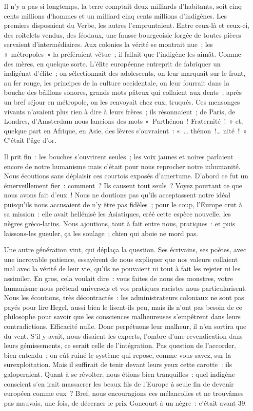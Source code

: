 \documentclass[french,twoside]{book} %
\newcommand\chaptercont{} %
\begin{document}
\chaptercont
\noindent Il n’y a pas si longtemps, la terre comptait deux milliards d’habitants, soit cinq cents millions d’hommes et un milliard cinq cents millions d’indigènes. Les premiers disposaient du Verbe, les autres l’empruntaient. Entre ceux-là et ceux-ci, des roitelets vendus, des féodaux, une fausse bourgeoisie forgée de toutes pièces servaient d’intermédiaires. Aux colonies la vérité se montrait nue ; les « métropoles » la préféraient vêtue ; il fallait que l’indigène les aimât. Comme des mères, en quelque sorte. L’élite européenne entreprit de fabriquer un indigénat d’élite ; on sélectionnait des adolescents, on leur marquait sur le front, au fer rouge, les principes de la culture occidentale, on leur fourrait dans la bouche des bâillons sonores, grands mots pâteux qui collaient aux dents ; après un bref séjour en métropole, on les renvoyait chez eux, truqués. Ces mensonges vivants n’avaient plus rien à dire à leurs frères ; ils résonnaient ; de Paris, de Londres, d’Amsterdam nous lancions des mots « Parthénon ! Fraternité ! » et, quelque part en Afrique, en Asie, des lèvres s’ouvraient : « … thénon !… nité ! » C’était l’âge d’or.\par
Il prit fin : les bouches s’ouvrirent seules ; les voix jaunes et noires parlaient encore de notre humanisme mais c’était pour nous reprocher notre inhumanité. Nous écoutions sans déplaisir ces courtois exposés d’amertume. D’abord ce fut un émerveillement fier : comment ? Ils causent tout seuls ? Voyez pourtant ce que nous avons fait d’eux ! Nous ne doutions pas qu’ils acceptassent notre idéal puisqu’ils nous accusaient de n’y être pas fidèles ; pour le coup, l’Europe crut à sa mission : elle avait hellénisé les Asiatiques, créé cette espèce nouvelle, les nègres gréco-latins. Nous ajoutions, tout à fait entre nous, pratiques : et puis laissons-les gueuler, ça les soulage ; chien qui aboie ne mord pas.\par
 Une autre génération vint, qui déplaça la question. Ses écrivains, ses poètes, avec une incroyable patience, essayèrent de nous expliquer que nos valeurs collaient mal avec la vérité de leur vie, qu’ils ne pouvaient ni tout à fait les rejeter ni les assimiler. En gros, cela voulait dire : vous faites de nous des monstres, votre humanisme nous prétend universels et vos pratiques racistes nous particularisent. Nous les écoutions, très décontractés : les administrateurs coloniaux ne sont pas payés pour lire Hegel, aussi bien le lisent-ils peu, mais ils n’ont pas besoin de ce philosophe pour savoir que les consciences malheureuses s’empêtrent dans leurs contradictions. Efficacité nulle. Donc perpétuons leur malheur, il n’en sortira que du vent. S’il y avait, nous disaient les experts, l’ombre d’une revendication dans leurs gémissements, ce serait celle de l’intégration. Pas question de l’accorder, bien entendu : on eût ruiné le système qui repose, comme vous savez, sur la surexploitation. Mais il suffirait de tenir devant leurs yeux cette carotte : ils galoperaient. Quant à se révolter, nous étions bien tranquilles : quel indigène conscient s’en irait massacrer les beaux fils de l’Europe à seule fin de devenir européen comme eux ? Bref, nous encouragions ces mélancolies et ne trouvâmes pas mauvais, une fois, de décerner le prix Goncourt à un nègre : c’était avant 39.\par
\end{document}
